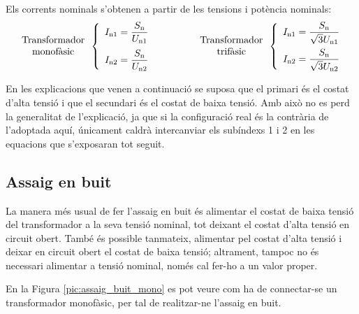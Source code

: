 Els corrents nominals s'obtenen a partir de les tensions i potència
nominals:
\begin{equation}
\begin{array}{c}\text{Transformador}\\
\text{monofàsic}
\end{array} \left\{
\begin{array}{l}
   I_\mathrm{n1} = \dfrac{S_\mathrm{n}}{U_\mathrm{n1}} \\[2.7ex]
   I_\mathrm{n2} = \dfrac{S_\mathrm{n}}{U_\mathrm{n2}}
\end{array}
\right. \qquad\qquad
\begin{array}{c}\text{Transformador}\\
\text{trifàsic}
\end{array} \left\{
\begin{array}{l}
   I_\mathrm{n1} = \dfrac{S_\mathrm{n}}{\sqrt{3}U_\mathrm{n1}} \\[2.5ex]
   I_\mathrm{n2} = \dfrac{S_\mathrm{n}}{\sqrt{3}U_\mathrm{n2}}
\end{array}
\right.
\end{equation}

En les explicacions que venen a continuació se suposa que el
primari és el costat d'alta tensió i que el secundari és el costat
de baixa tensió. Amb això no es perd la generalitat de
l'explicació, ja que si la configuració real és la contrària de l'adoptada aquí, únicament caldrà intercanviar els subíndexs 1 i 2 en
les equacions que s'exposaran tot seguit.

\subsection{Assaig en buit}

La manera més usual de fer l'assaig en buit és alimentar el costat
de baixa tensió del transformador a  la seva tensió nominal, tot
deixant el costat d'alta tensió en circuit obert. També és possible
tanmateix, alimentar pel costat d'alta tensió i deixar en circuit
obert el costat de baixa tensió; altrament, tampoc no és necessari
alimentar a tensió nominal, només cal fer-ho a un valor proper.

En la Figura \vref{pic:assaig_buit_mono} es pot veure com ha de
connectar-se un transformador monofàsic, per tal de realitzar-ne
l'assaig en buit.

\begin{center}
    
    \label{pic:assaig_buit_mono}
\end{center}

